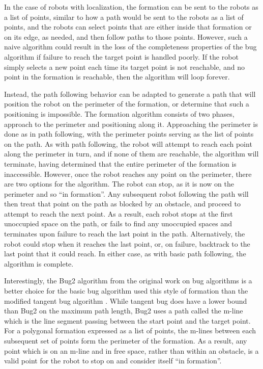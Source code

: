 In the case of robots with localization, the formation can be sent to the robots as a list of points, similar to how a path would be sent to the robots as a list of points, and the robots can select points that are either inside that formation or on its edge, as needed, and then follow paths to those points. 
However, such a naive algorithm could result in the loss of the completeness properties of the bug algorithm if failure to reach the target point is handled poorly. 
If the robot simply selects a new point each time its target point is not reachable, and no point in the formation is reachable, then the algorithm will loop forever. 

Instead, the path following behavior can be adapted to generate a path that will position the robot on the perimeter of the formation, or determine that such a positioning is impossible.
The formation algorithm consists of two phases, approach to the perimeter and positioning along it. 
Approaching the perimeter is done as in path following, with the perimeter points serving as the list of points on the path. 
As with path following, the robot will attempt to reach each point along the perimeter in turn, and if none of them are reachable, the algorithm will terminate, having determined that the entire perimeter of the formation is inaccessible. 
However, once the robot reaches any point on the perimeter, there are two options for the algorithm. 
The robot can stop, as it is now on the perimeter and so ``in formation''. 
Any subsequent robot following the path will then treat that point on the path as blocked by an obstacle, and proceed to attempt to reach the next point. 
As a result, each robot stops at the first unoccupied space on the path, or fails to find any unoccupied spaces and terminates upon failure to reach the last point in the path. 
Alternatively, the robot could stop when it reaches the last point, or, on failure, backtrack to the last point that it could reach.%
In either case, as with basic path following, the algorithm is complete. 

Interestingly, the Bug2 algorithm from the original work on bug algorithms is a better choice for the basic bug algorithm used this style of formation than the modified tangent bug algorithm \citep{lumelsky1987path}. 
While tangent bug does have a lower bound than Bug2 on the maximum path length, Bug2 uses a path called the m-line which is the line segment passing between the start point and the target point.
For a polygonal formation expressed as a list of points, the m-lines between each subsequent set of points form the perimeter of the formation. 
As a result, any point which is on an m-line and in free space, rather than within an obstacle, is a valid point for the robot to stop on and consider itself ``in formation''. 


